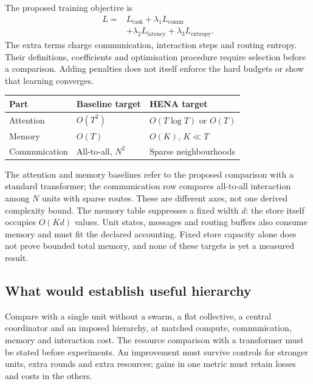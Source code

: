 The proposed training objective is
\begin{equation}
\begin{split}
 L={}&L_{\mathrm{task}}+\lambda_1 L_{\mathrm{comm}}\\
     &+\lambda_2 L_{\mathrm{latency}}+\lambda_3 L_{\mathrm{entropy}}.
\end{split}
\end{equation}
The extra terms charge communication, interaction steps and routing entropy. Their definitions, coefficients and optimisation procedure require selection before a comparison. Adding penalties does not itself enforce the hard budgets or show that learning converges.

\begin{center}
\small
\setlength{\tabcolsep}{3pt}
\begin{tabular}{@{}lll@{}}
\hline
Part & Baseline target & HENA target\\
\hline
Attention & $O(T^2)$ & $O(T\log T)$ or $O(T)$\\
Memory & $O(T)$ & $O(K)$, $K\ll T$\\
Communication & All-to-all, $N^2$ & Sparse neighbourhoods\\
\hline
\end{tabular}
\end{center}

The attention and memory baselines refer to the proposed comparison with a standard transformer; the communication row compares all-to-all interaction among $N$ units with sparse routes. These are different axes, not one derived complexity bound. The memory table suppresses a fixed width $d$: the store itself occupies $O(Kd)$ values. Unit states, messages and routing buffers also consume memory and must fit the declared accounting. Fixed store capacity alone does not prove bounded total memory, and none of these targets is yet a measured result.

\subsection{What would establish useful hierarchy}

Compare with a single unit without a swarm, a flat collective, a central coordinator and an imposed hierarchy, at matched compute, communication, memory and interaction cost. The resource comparison with a transformer must be stated before experiments. An improvement must survive controls for stronger units, extra rounds and extra resources; gains in one metric must retain losses and costs in the others.

